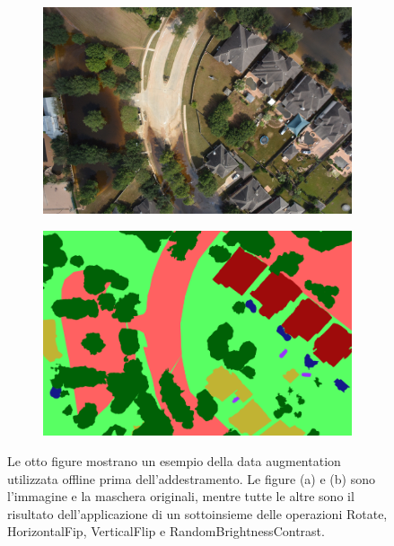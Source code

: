 \begin{figure}[h!]
\begin{subfigure}[b]{0.45\textwidth}
         \caption{}
         \label{}
     \end{subfigure}
     \begin{subfigure}[b]{0.45\textwidth}
         \centering
         \includegraphics[width=\textwidth]{img/7310_2.jpg}
         \caption{}
         \label{}
     \end{subfigure}
     \hfill
     \begin{subfigure}[b]{0.45\textwidth}
         \centering
         \includegraphics[width=\textwidth]{img/7310_2_lab.png}
         \caption{}
         \label{}
     \end{subfigure}
     
        \caption{Le otto figure mostrano un esempio della data augmentation utilizzata offline prima dell'addestramento. Le figure (a) e (b) sono l'immagine e la maschera originali, mentre tutte le altre sono il risultato dell'applicazione di un sottoinsieme delle operazioni Rotate, HorizontalFip, VerticalFlip e RandomBrightnessContrast.}
        \label{fig:esempi_data_aug}
\end{figure}

